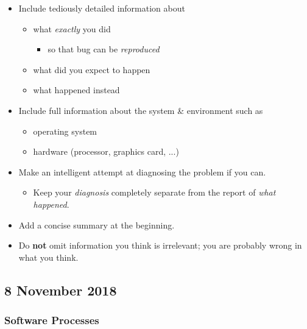 \documentclass[a4paper]{article}
\providecommand{\tightlist}{%
  \setlength{\itemsep}{0pt}\setlength{\parskip}{0pt}}
\begin{document}
\begin{itemize}
  \begin{itemize}
  \tightlist
  \item
    Include tediously detailed information about

    \begin{itemize}
    \tightlist
    \item
      what \emph{exactly} you did

      \begin{itemize}
      \tightlist
      \item
        so that bug can be \emph{reproduced}
      \end{itemize}
    \item
      what did you expect to happen
    \item
      what happened instead
    \end{itemize}
  \item
    Include full information about the system \& environment such as

    \begin{itemize}
    \tightlist
    \item
      operating system
    \item
      hardware (processor, graphics card, ...)
    \end{itemize}
  \item
    Make an intelligent attempt at diagnosing the problem if you can.

    \begin{itemize}
    \tightlist
    \item
      Keep your \emph{diagnosis} completely separate from the report of
      \emph{what happened}.
    \end{itemize}
  \item
    Add a concise summary at the beginning.
  \item
    Do \textbf{not} omit information you think is irrelevant; you are
    probably wrong in what you think.
  \end{itemize}
\end{itemize}

\hypertarget{8-november-2018}{%
\subsection{8 November 2018}\label{8-november-2018}}

\hypertarget{software-processes}{%
\subsubsection{Software Processes}\label{software-processes}}
\end{document}
